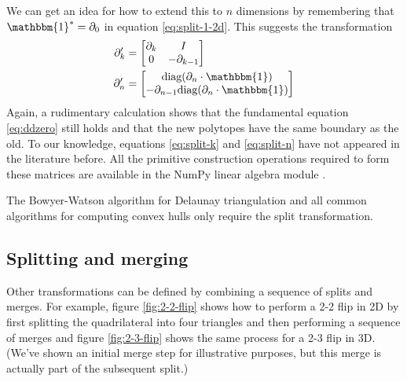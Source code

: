 \documentclass[twocolumn]{article}
\begin{document}
We can get an idea for how to extend this to $n$ dimensions by remembering that $\mathbbm{1}^* = \partial_0$ in equation \eqref{eq:split-1-2d}.
This suggests the transformation
\begin{align}
    \partial_k' & = \left[\begin{matrix}\partial_k & I \\ 0 & -\partial_{k - 1}\end{matrix}\right] \label{eq:split-k} \\
    \partial_n' & = \left[\begin{matrix}\text{diag}(\partial_n\cdot\mathbbm{1}) \\ -\partial_{n - 1}\text{diag}(\partial_n\cdot\mathbbm{1})\end{matrix}\right] \label{eq:split-n}
\end{align}
Again, a rudimentary calculation shows that the fundamental equation \eqref{eq:ddzero} still holds and that the new polytopes have the same boundary as the old.
To our knowledge, equations \eqref{eq:split-k} and \eqref{eq:split-n} have not appeared in the literature before.
All the primitive construction operations required to form these matrices are available in the NumPy linear algebra module \cite{harris2020array}.

The Bowyer-Watson algorithm \cite{bowyer1981computing, watson1981computing} for Delaunay triangulation and all common algorithms for computing convex hulls \cite{berg1997computational} only require the split transformation.

\subsection{Splitting and merging}

Other transformations can be defined by combining a sequence of splits and merges.
For example, figure \ref{fig:2-2-flip} shows how to perform a 2-2 flip in 2D by first splitting the quadrilateral into four triangles and then performing a sequence of merges and figure \ref{fig:2-3-flip} shows the same process for a 2-3 flip in 3D.
(We've shown an initial merge step for illustrative purposes, but this merge is actually part of the subsequent split.)
\end{document}
